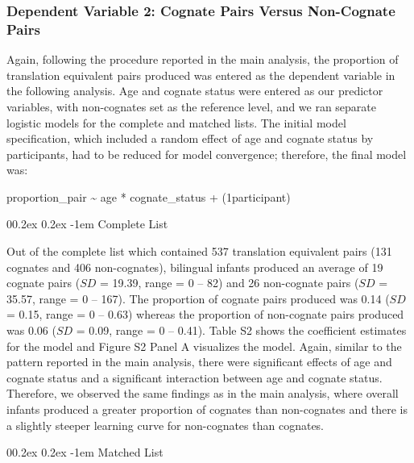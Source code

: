 \documentclass[
  ,man,floatsintext]{apa6}
\makeatletter
\let\oldparagraph\paragraph
\renewcommand{\paragraph}[1]{\oldparagraph{#1}\mbox{}}
\renewcommand{\paragraph}{\@startsection{paragraph}{4}{\parindent}%
  {0\baselineskip \@plus 0.2ex \@minus 0.2ex}%
  {-1em}%
  {\normalfont\normalsize\bfseries\itshape\typesectitle}}
\makeatother
\begin{document}
\hypertarget{dependent-variable-2-cognate-pairs-versus-non-cognate-pairs}{%
\subsubsection{Dependent Variable 2: Cognate Pairs Versus Non-Cognate Pairs}\label{dependent-variable-2-cognate-pairs-versus-non-cognate-pairs}}

Again, following the procedure reported in the main analysis, the proportion of translation equivalent pairs produced was entered as the dependent variable in the following analysis. Age and cognate status were entered as our predictor variables, with non-cognates set as the reference level, and we ran separate logistic models for the complete and matched lists. The initial model specification, which included a random effect of age and cognate status by participants, had to be reduced for model convergence; therefore, the final model was:

proportion\_pair \textasciitilde{} age * cognate\_status + (1\textbar participant)

\hypertarget{complete-list-1}{%
\paragraph{Complete List}\label{complete-list-1}}

Out of the complete list which contained 537 translation equivalent pairs (131 cognates and 406 non-cognates), bilingual infants produced an average of 19 cognate pairs (\(SD\) = 19.39, range = 0 -- 82) and 26 non-cognate pairs (\(SD\) = 35.57, range = 0 -- 167). The proportion of cognate pairs produced was 0.14 (\(SD\) = 0.15, range = 0 -- 0.63) whereas the proportion of non-cognate pairs produced was 0.06 (\(SD\) = 0.09, range = 0 -- 0.41). Table S2 shows the coefficient estimates for the model and Figure S2 Panel A visualizes the model. Again, similar to the pattern reported in the main analysis, there were significant effects of age and cognate status and a significant interaction between age and cognate status. Therefore, we observed the same findings as in the main analysis, where overall infants produced a greater proportion of cognates than non-cognates and there is a slightly steeper learning curve for non-cognates than cognates.

\hypertarget{matched-list-1}{%
\paragraph{Matched List}\label{matched-list-1}}
\end{document}
